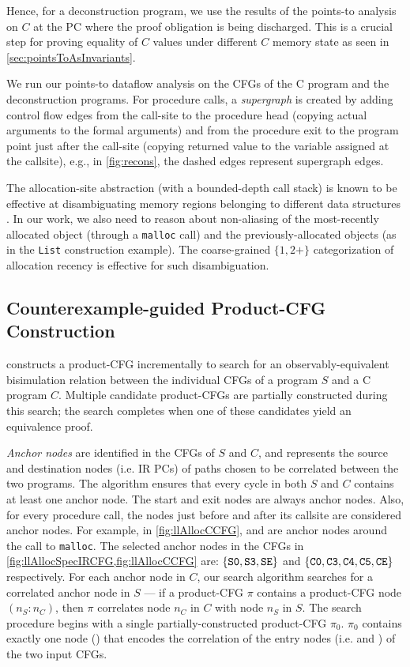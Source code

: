 Hence, for a deconstruction program, we use the results of the points-to analysis on $C$ at the PC where
the proof obligation is being discharged. This is a crucial step for proving equality of $C$ values
under different $C$ memory state as seen in \cref{sec:pointsToAsInvariants}.

We run our points-to dataflow analysis on the CFGs of the C program and the deconstruction programs.
For procedure calls, a {\em supergraph} is created by adding control flow edges
from the call-site to the procedure head (copying actual arguments to the formal arguments) and
from the procedure exit to the program point just after the
call-site (copying returned value to the variable assigned at the callsite),
e.g., in \cref{fig:recons}, the dashed edges represent supergraph edges.

The allocation-site abstraction (with a bounded-depth call stack) is
known to be effective at disambiguating memory regions belonging to
different data structures
\cite{allocationSiteAbstraction82,allocationSiteAbstraction90,allocationSiteAbstraction06}.
In our work, we also need to reason about non-aliasing
of the most-recently allocated object (through a {\tt malloc} call) and
the previously-allocated objects (as in the {\tt List}
construction example). The coarse-grained $\{1, 2+\}$
categorization of allocation recency is effective for such
disambiguation.

\subsection{Counterexample-guided Product-CFG Construction}
\label{sec:searchalgo}
\toolName{} constructs a product-CFG incrementally to search for an observably-equivalent
bisimulation relation between the individual CFGs of a \SpecL{} program $S$ and a C program $C$.
Multiple candidate product-CFGs are partially constructed during this search;
the search completes when one of these candidates yield an equivalence proof.

{\em Anchor nodes} are identified in the CFGs of $S$ and $C$, and represents the source and destination nodes (i.e. IR PCs)
of paths chosen to be correlated between the two programs.
The algorithm ensures that every cycle in both $S$ and $C$ contains at least one anchor node.
The start and exit nodes are always anchor nodes.
Also, for every procedure call, the nodes just before and after its callsite are considered anchor nodes.
For example, in \cref{fig:llAllocCCFG},  and  are anchor nodes around the call to {\tt malloc}.
The selected anchor nodes in the CFGs in \cref{fig:llAllocSpecIRCFG,fig:llAllocCCFG} are:
$\{ {\tt S0},{\tt S3},{\tt SE} \}$ and $\{ {\tt C0}, {\tt C3}, {\tt C4}, {\tt C5}, {\tt CE} \}$ respectively.
For each anchor node in $C$, our search algorithm searches for a correlated anchor node in $S$ --- if
a product-CFG $\pi$ contains a product-CFG node  $(n_S\!:\!n_C)$, then $\pi$
correlates node $n_C$ in $C$ with node $n_S$ in $S$.
The search procedure begins with a single partially-constructed product-CFG $\pi_0$.
$\pi_0$ contains exactly one node () that encodes the correlation of the entry nodes
(i.e.  and ) of the two input CFGs.

